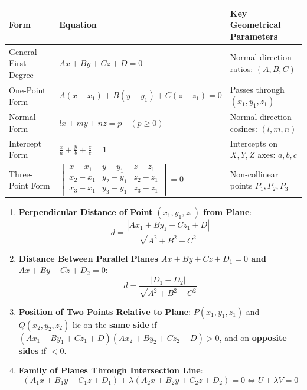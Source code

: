 \begin{theorembox}
\begin{center}
\small
\renewcommand{\arraystretch}{1.25}
\setlength{\tabcolsep}{4pt}
\begin{tabular}{|p{3.5cm}|p{5.1cm}|p{5.3cm}|}
\hline
\textbf{Form} & \textbf{Equation} & \textbf{Key Geometrical Parameters} \\
\hline
General First-Degree & $\displaystyle Ax + By + Cz + D = 0$ & Normal direction ratios: $(A, B, C)$ \\
One-Point Form & $\displaystyle A(x-x_1) + B(y-y_1) + C(z-z_1) = 0$ & Passes through $(x_1, y_1, z_1)$ \\
Normal Form & $\displaystyle lx + my + nz = p \quad (p \ge 0)$ & Normal direction cosines: $(l, m, n)$ \\
Intercept Form & $\displaystyle \frac{x}{a} + \frac{y}{b} + \frac{z}{c} = 1$ & Intercepts on $X, Y, Z$ axes: $a, b, c$ \\
Three-Point Form & $\displaystyle \begin{vmatrix} x-x_1 & y-y_1 & z-z_1 \\ x_2-x_1 & y_2-y_1 & z_2-z_1 \\ x_3-x_1 & y_3-y_1 & z_3-z_1 \end{vmatrix} = 0$ & Non-collinear points $P_1, P_2, P_3$ \\
\hline
\end{tabular}
\end{center}
\end{theorembox}

\begin{theorembox}
\begin{enumerate}
    \item \textbf{Perpendicular Distance of Point $(x_1, y_1, z_1)$ from Plane}:
    \begin{equation}
        \boxed{d = \frac{|Ax_1 + By_1 + Cz_1 + D|}{\sqrt{A^2 + B^2 + C^2}}}
    \end{equation}
    \item \textbf{Distance Between Parallel Planes $Ax+By+Cz+D_1=0$ and $Ax+By+Cz+D_2=0$}:
    \begin{equation}
        \boxed{d = \frac{|D_1 - D_2|}{\sqrt{A^2 + B^2 + C^2}}}
    \end{equation}
    \item \textbf{Position of Two Points Relative to Plane}:
    $P(x_1,y_1,z_1)$ and $Q(x_2,y_2,z_2)$ lie on the \textbf{same side} if $(Ax_1+By_1+Cz_1+D)(Ax_2+By_2+Cz_2+D) > 0$, and on \textbf{opposite sides} if $< 0$.
    \item \textbf{Family of Planes Through Intersection Line}:
    \begin{equation}
        \boxed{(A_1 x + B_1 y + C_1 z + D_1) + \lambda(A_2 x + B_2 y + C_2 z + D_2) = 0 \iff U + \lambda V = 0}
    \end{equation}
\end{enumerate}
\end{theorembox}

